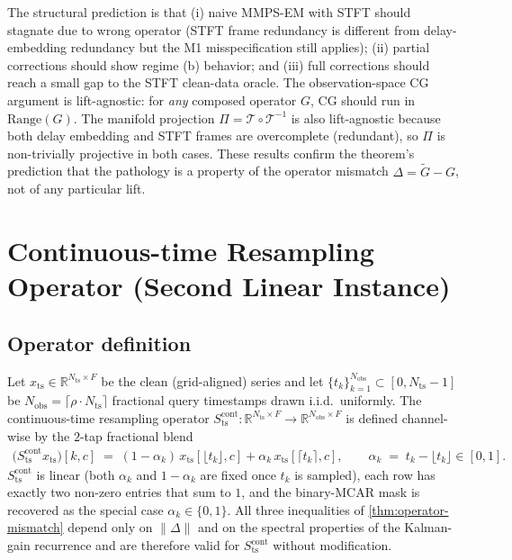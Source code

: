 \documentclass{article}
\theoremstyle{plain}
\theoremstyle{definition}
\theoremstyle{remark}
\newcommand{\tsimg}{\mathcal{T}}
\newcommand{\imgts}{\mathcal{T}^{-1}}
\newcommand{\Nts}{N_{\mathrm{ts}}}
\newcommand{\Nobs}{N_{\mathrm{obs}}}
\newcommand{\xts}{x_{\mathrm{ts}}}
\begin{document}
The structural prediction is that (i) naive MMPS-EM with STFT should stagnate due to wrong operator (STFT frame redundancy is different from delay-embedding redundancy but the M1 misspecification still applies); (ii) partial corrections should show regime (b) behavior; and (iii) full corrections should reach a small gap to the STFT clean-data oracle. The observation-space CG argument is lift-agnostic: for \emph{any} composed operator $G$, CG should run in $\mathrm{Range}(G)$. The manifold projection $\Pi = \tsimg \circ \imgts$ is also lift-agnostic because both delay embedding and STFT frames are overcomplete (redundant), so $\Pi$ is non-trivially projective in both cases. These results confirm the theorem's prediction that the pathology is a property of the operator mismatch $\Delta = \tilde{G} - G$, not of any particular lift.

\section{Continuous-time Resampling Operator (Second Linear Instance)}
\label{app:continuous}

\subsection{Operator definition}
\label{app:continuous-def}

Let $\xts \in \mathbb{R}^{\Nts \times F}$ be the clean (grid-aligned) series and let $\{t_k\}_{k=1}^{\Nobs} \subset [0, \Nts - 1]$ be $\Nobs = \lceil \rho \cdot \Nts \rceil$ fractional query timestamps drawn i.i.d.\ uniformly. The continuous-time resampling operator $S_{\mathrm{ts}}^{\mathrm{cont}} : \mathbb{R}^{\Nts \times F} \to \mathbb{R}^{\Nobs \times F}$ is defined channel-wise by the $2$-tap fractional blend
\begin{align}
\bigl(S_{\mathrm{ts}}^{\mathrm{cont}} \xts\bigr)[k, c]
\;=\; (1 - \alpha_k)\,\xts[\lfloor t_k \rfloor, c] + \alpha_k\,\xts[\lceil t_k \rceil, c],
\qquad \alpha_k \;=\; t_k - \lfloor t_k \rfloor \in [0, 1].
\label{eq:continuous-op}
\end{align}
$S_{\mathrm{ts}}^{\mathrm{cont}}$ is linear (both $\alpha_k$ and $1-\alpha_k$ are fixed once $t_k$ is sampled), each row has exactly two non-zero entries that sum to $1$, and the binary-MCAR mask is recovered as the special case $\alpha_k \in \{0, 1\}$. All three inequalities of \cref{thm:operator-mismatch} depend only on $\|\Delta\|$ and on the spectral properties of the Kalman-gain recurrence and are therefore valid for $S_{\mathrm{ts}}^{\mathrm{cont}}$ without modification.
\end{document}
